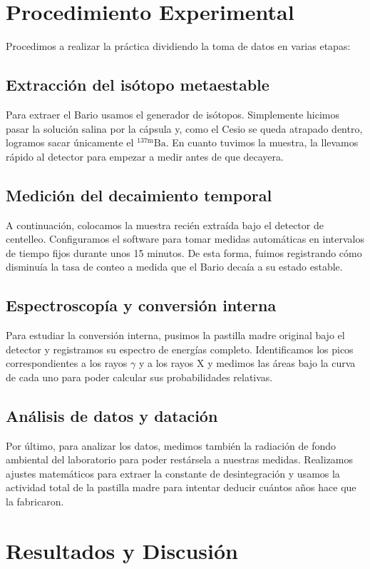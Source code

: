 \documentclass[9pt,a4paper,twocolumn,twoside]{rho-class/rho}
\begin{document}
\section{Procedimiento Experimental}

Procedimos a realizar la práctica dividiendo la toma de datos en varias etapas:

\subsection{Extracción del isótopo metaestable}
Para extraer el Bario usamos el generador de isótopos. Simplemente hicimos pasar la solución salina por la cápsula y, como el Cesio se queda atrapado dentro, logramos sacar únicamente el $^{137\text{m}}\text{Ba}$. En cuanto tuvimos la muestra, la llevamos rápido al detector para empezar a medir antes de que decayera.
\subsection{Medición del decaimiento temporal}
A continuación, colocamos la muestra recién extraída bajo el detector de centelleo. Configuramos el software para tomar medidas automáticas en intervalos de tiempo fijos durante unos 15 minutos. De esta forma, fuimos registrando cómo disminuía la tasa de conteo a medida que el Bario decaía a su estado estable.

\subsection{Espectroscopía y conversión interna}
Para estudiar la conversión interna, pusimos la pastilla madre original bajo el detector y registramos su espectro de energías completo. Identificamos los picos correspondientes a los rayos $\gamma$ y a los rayos X y medimos las áreas bajo la curva de cada uno para poder calcular sus probabilidades relativas.

\subsection{Análisis de datos y datación}
Por último, para analizar los datos, medimos también la radiación de fondo ambiental del laboratorio para poder restársela a nuestras medidas. Realizamos ajustes matemáticos para extraer la constante de desintegración y usamos la actividad total de la pastilla madre para intentar deducir cuántos años hace que la fabricaron.

\section{Resultados y Discusión}
\end{document}
